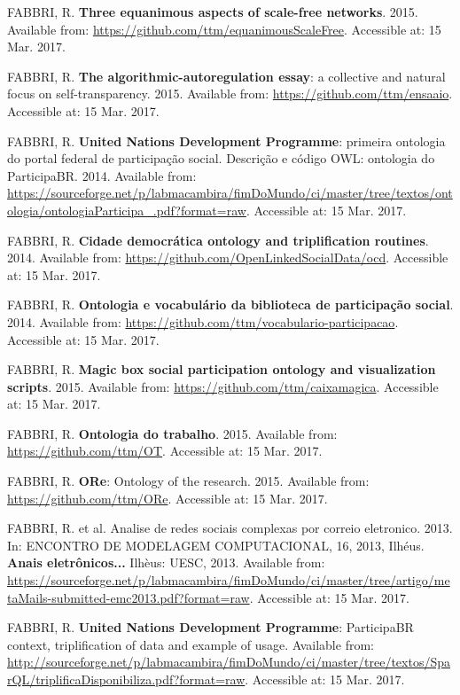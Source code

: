 \documentclass[
12pt,		%
openright,	%
twoside,  %
a4paper,			%
chapter=TITLE,		%
english,			%
french,				%
spanish,			%
brazil				%
]{USPSC}
\begin{document}
\begin{thebibliography}{999}
	FABBRI, R. \textbf{Three equanimous aspects of scale-free networks}. 2015. Available from: \url{https://github.com/ttm/equanimousScaleFree}. Accessible at: 15 Mar. 2017.

	FABBRI, R. \textbf{The algorithmic-autoregulation essay}: a collective and natural focus on self-transparency. 2015. Available from: \url{https://github.com/ttm/ensaaio}. Accessible at: 15 Mar. 2017.

	FABBRI, R. \textbf{United Nations Development Programme}: primeira ontologia do portal federal de participação social. Descrição e código OWL: ontologia do ParticipaBR. 2014. Available from: \url{https://sourceforge.net/p/labmacambira/fimDoMundo/ci/master/tree/textos/ontologia/ontologiaParticipa_.pdf?format=raw}. Accessible at: 15 Mar. 2017.

	FABBRI, R. \textbf{Cidade democrática ontology and triplification routines}. 2014. Available from: \url{https://github.com/OpenLinkedSocialData/ocd}. Accessible at: 15 Mar. 2017.

	FABBRI, R. \textbf{Ontologia e vocabulário da biblioteca de participação social}. 2014. Available from: \url{https://github.com/ttm/vocabulario-participacao}. Accessible at: 15 Mar. 2017.

	FABBRI, R. \textbf{Magic box social participation ontology and visualization scripts}. 2015. Available from: \url{https://github.com/ttm/caixamagica}. Accessible at: 15 Mar. 2017.

	FABBRI, R. \textbf{Ontologia do trabalho}. 2015. Available from: \url{https://github.com/ttm/OT}. Accessible at: 15 Mar. 2017.

	FABBRI, R. \textbf{ORe}: Ontology of the research. 2015. Available from: \url{https://github.com/ttm/ORe}. Accessible at: 15 Mar. 2017.

	FABBRI, R. et al. Analise de redes sociais complexas por correio eletronico. 2013. In: ENCONTRO DE MODELAGEM COMPUTACIONAL, 16, 2013, Ilhéus.  \textbf{Anais eletrônicos...} Ilhèus: UESC, 2013. Available from: \url{https://sourceforge.net/p/labmacambira/fimDoMundo/ci/master/tree/artigo/metaMails-submitted-emc2013.pdf?format=raw}. Accessible at: 15 Mar. 2017.

	FABBRI, R. \textbf{United Nations Development Programme}: ParticipaBR context, triplification of data and example of usage. Available from: \url{http://sourceforge.net/p/labmacambira/fimDoMundo/ci/master/tree/textos/SparQL/triplificaDisponibiliza.pdf?format=raw}. Accessible at: 15 Mar. 2017.


\end{thebibliography}
\end{document}
